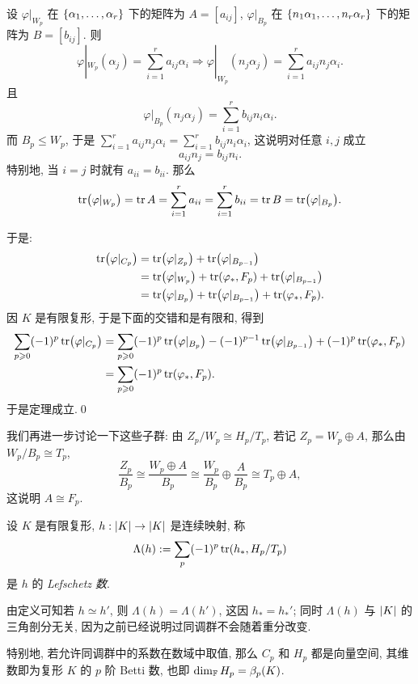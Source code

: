\begin{Proof}
	设 $ \varphi|_{W_p} $ 在 $ \left\{ \alpha_1,\dots,\alpha_r \right\} $ 下的矩阵为 $ A=[a_{ij}] $, $ \varphi|_{B_p} $ 在 $ \left\{ n_1\alpha_1,\dots,n_r\alpha_r \right\} $ 下的矩阵为 $ B=[b_{ij}] $. 则
	\[
		\varphi|_{W_p}(\alpha_j)=\sum_{i=1}^ra_{ij}\alpha_i\Longrightarrow\varphi|_{W_p}(n_j\alpha_j)=\sum_{i=1}^ra_{ij}n_j\alpha_i.
	\]
	且
	\[
		\varphi|_{B_p}(n_j\alpha_j)=\sum_{i=1}^rb_{ij}n_i\alpha_i.
	\]
	而 $ B_p\leqslant W_p $, 于是 $ \sum_{i=1}^ra_{ij}n_j\alpha_i=\sum_{i=1}^rb_{ij}n_i\alpha_i $, 这说明对任意 $ i,j $ 成立
	\[
		a_{ij}n_j=b_{ij}n_i.
	\]
	特别地, 当 $ i=j $ 时就有 $ a_{ii}=b_{ii} $. 那么
	\[
		\tr(\varphi|_{W_p})=\tr A=\sum_{i=1}^ra_{ii}=\sum_{i=1}^rb_{ii}=\tr B=\tr(\varphi|_{B_p}).
	\]

	于是:
	\[
		\begin{aligned}
			\tr(\varphi|_{C_p})&=\tr(\varphi|_{Z_p})+\tr(\varphi|_{B_{p-1}})\\
			&=\tr(\varphi|_{W_p})+\tr(\varphi_*,F_p)+\tr(\varphi|_{B_{p-1}})\\
			&=\tr(\varphi|_{B_p})+\tr(\varphi|_{B_{p-1}})+\tr(\varphi_*,F_p).
		\end{aligned}
	\]
	因 $ K $ 是有限复形, 于是下面的交错和是有限和, 得到
	\[
		\begin{aligned}
			\sum_{p\geqslant 0}(-1)^p\tr(\varphi|_{C_p})&=\sum_{p\geqslant 0}(-1)^p\tr(\varphi|_{B_p})-(-1)^{p-1}\tr(\varphi|_{B_{p-1}})+(-1)^p\tr(\varphi_*,F_p)\\
			&=\sum_{p\geqslant 0}(-1)^p\tr(\varphi_*,F_p).
		\end{aligned}
	\]
	于是定理成立.\qed
\end{Proof}

我们再进一步讨论一下这些子群: 由 $ Z_p/W_p\cong H_p/T_p $, 若记 $ Z_p=W_p\oplus A $, 那么由 $ W_p/B_p\cong T_p $,
\[
	\frac{Z_p}{B_p}\cong\frac{W_p\oplus A}{B_p}\cong\frac{W_p}{B_p}\oplus\frac{A}{B_p}\cong T_p\oplus A,
\]
这说明 $ A\cong F_p $.

\begin{Definition}[Lefschetz 数]
	设 $ K $ 是有限复形, $ h : \left| K \right| \to\left| K \right|  $ 是连续映射, 称
	\[
		\Lambda(h):=\sum_{p}(-1)^p\tr(h_*,H_p/T_p)
	\]
	是 $ h $ 的 \emph{Lefschetz 数}.
\end{Definition}

由定义可知若 $ h\simeq h' $, 则 $ \Lambda(h)=\Lambda(h') $, 这因 $ h_*=h_*' $; 同时 $ \Lambda(h) $ 与 $ \left| K \right|  $ 的三角剖分无关, 因为之前已经说明过同调群不会随着重分改变. 

特别地, 若允许同调群中的系数在数域中取值, 那么 $ C_p $ 和 $ H_p $ 都是向量空间, 其维数即为复形 $ K $ 的 $ p $ 阶 Betti 数, 也即 $ \dim_{\mathbb{F}} H_p=\beta_p(K) $.

